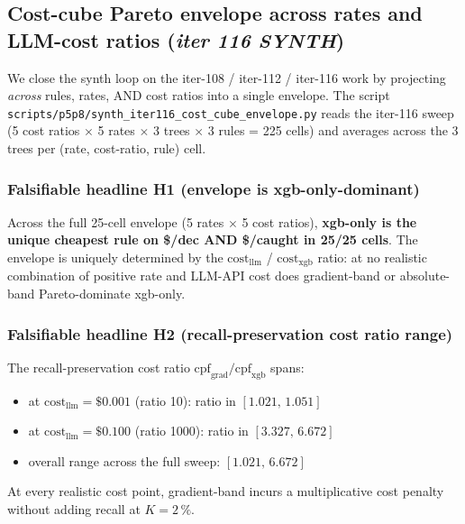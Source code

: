 \subsection{Cost-cube Pareto envelope across rates and LLM-cost ratios
  (\textit{iter 116 SYNTH})}
\label{sec:p8-cost-cube-envelope}

We close the synth loop on the iter-108 / iter-112 / iter-116 work by
projecting \emph{across} rules, rates, AND cost ratios into a single
envelope. The script
\texttt{scripts/p5p8/synth\_iter116\_cost\_cube\_envelope.py} reads the
iter-116 sweep (5 cost ratios $\times$ 5 rates $\times$ 3 trees
$\times$ 3 rules = 225 cells) and averages across the 3 trees per
(rate, cost-ratio, rule) cell.

\subsubsection{Falsifiable headline H1 (envelope is xgb-only-dominant)}
Across the full 25-cell envelope (5 rates $\times$ 5 cost ratios),
\textbf{xgb-only is the unique cheapest rule on \$/dec AND \$/caught
in 25/25 cells}. The envelope is uniquely determined by the
$\mathrm{cost}_{\mathrm{llm}}$ / $\mathrm{cost}_{\mathrm{xgb}}$ ratio:
at no realistic combination of positive rate and LLM-API cost does
gradient-band or absolute-band Pareto-dominate xgb-only.

\subsubsection{Falsifiable headline H2 (recall-preservation cost ratio range)}
The recall-preservation cost ratio
$\mathrm{cpf}_{\mathrm{grad}}/\mathrm{cpf}_{\mathrm{xgb}}$ spans:
\begin{itemize}
  \item at $\mathrm{cost}_{\mathrm{llm}}{=}\$0.001$ (ratio 10):
        ratio in $[1.021,\,1.051]$
  \item at $\mathrm{cost}_{\mathrm{llm}}{=}\$0.100$ (ratio 1000):
        ratio in $[3.327,\,6.672]$
  \item overall range across the full sweep: $[1.021,\,6.672]$
\end{itemize}
At every realistic cost point, gradient-band incurs a multiplicative
cost penalty without adding recall at $K{=}2\,\%$.


